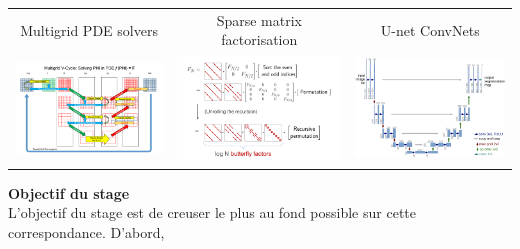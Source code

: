 \documentclass[a4paper,11pt]{article}
\begin{document}
\begin{tabular}{ccc}
	\sf\color{blue} Multigrid PDE solvers&
	\sf\color{blue} Sparse matrix factorisation &
	\sf\color{blue} U-net ConvNets\\
	\includegraphics[width=0.3\linewidth]{f/multigrid.png} &
	\includegraphics[width=0.32\linewidth]{f/butterflies.png} &
	\includegraphics[width=0.32\linewidth]{f/cunet.png} \\
\end{tabular}


{\bf Objectif du stage}\\
L'objectif du stage est de creuser le plus au fond possible sur cette
correspondance.  D'abord,


\end{document}
